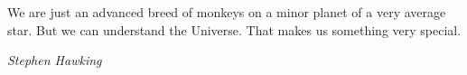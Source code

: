 \documentclass{article}
\begin{document}
\vspace{-4cm}
\epigraph{We are just an advanced breed of monkeys on a minor planet of a very average star. But we can understand the Universe. That makes us something very special.}{\textit{Stephen Hawking}}
\vspace*{\fill}
\newpage
\thispagestyle{empty} %
\mbox{} %
\newpage %
{
  \hypersetup{linkcolor=black}
  \tableofcontents
}
\newpage
{}
{}
\newpage
{}
\setcounter{page}{1}
\newpage
\newpage
\newpage
\newpage
\newpage
\appendix
\newpage

{}
\printbibliography
\end{document}
